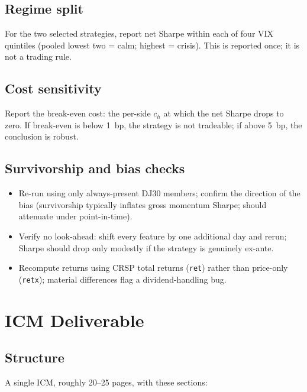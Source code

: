 \documentclass[11pt,letterpaper]{article}
\begin{document}
\subsection{Regime split}

For the two selected strategies, report net Sharpe within each of four VIX quintiles (pooled lowest two = calm; highest = crisis). This is reported once; it is not a trading rule.

\subsection{Cost sensitivity}

Report the break-even cost: the per-side $c_h$ at which the net Sharpe drops to zero. If break-even is below 1~bp, the strategy is not tradeable; if above 5~bp, the conclusion is robust.

\subsection{Survivorship and bias checks}

\begin{itemize}[leftmargin=*]
  \item Re-run using only always-present DJ30 members; confirm the direction of the bias (survivorship typically inflates gross momentum Sharpe; should attenuate under point-in-time).
  \item Verify no look-ahead: shift every feature by one additional day and rerun; Sharpe should drop only modestly if the strategy is genuinely ex-ante.
  \item Recompute returns using CRSP total returns (\texttt{ret}) rather than price-only (\texttt{retx}); material differences flag a dividend-handling bug.
\end{itemize}

\section{ICM Deliverable}\label{sec:icm}

\subsection{Structure}

A single ICM, roughly 20--25 pages, with these sections:
\end{document}
